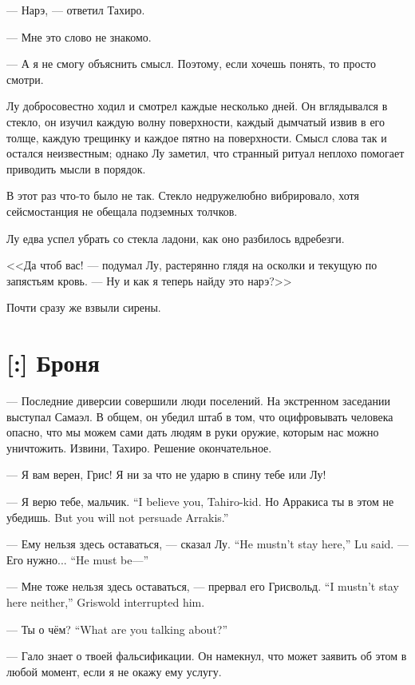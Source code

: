--- Нарэ, --- ответил Тахиро.

--- Мне это слово не знакомо.

--- А я не смогу объяснить смысл.
Поэтому, если хочешь понять, то просто смотри.

Лу добросовестно ходил и смотрел каждые несколько дней.
Он вглядывался в стекло, он изучил каждую волну поверхности, каждый дымчатый извив в его толще, каждую трещинку и каждое пятно на поверхности.
Смысл слова так и остался неизвестным;
однако Лу заметил, что странный ритуал неплохо помогает приводить мысли в порядок.

В этот раз что-то было не так.
Стекло недружелюбно вибрировало, хотя сейсмостанция не обещала подземных толчков.

Лу едва успел убрать со стекла ладони, как оно разбилось вдребезги.

<<Да чтоб вас! --- подумал Лу, растерянно глядя на осколки и текущую по запястьям кровь. --- Ну и как я теперь найду это нарэ?>>

Почти сразу же взвыли сирены.

\section{[:] Броня}

\textspace

--- Последние диверсии совершили люди поселений.
На экстренном заседании выступал Самаэл.
В общем, он убедил штаб в том, что оцифровывать человека опасно, что мы можем сами дать людям в руки оружие, которым нас можно уничтожить.
Извини, Тахиро.
Решение окончательное.

--- Я вам верен, Грис!
Я ни за что не ударю в спину тебе или Лу!

{--- Я верю тебе, мальчик.}
{``I believe you, Tahiro-kid.}
{Но Арракиса ты в этом не убедишь.}
{But you will not persuade Arrakis.''}

{--- Ему нельзя здесь оставаться, --- сказал Лу.}
{``He mustn't stay here,'' Lu said.}
{--- Его нужно...}
{``He must be---''}

{--- Мне тоже нельзя здесь оставаться, --- прервал его Грисвольд.}
{``I mustn't stay here neither,'' Griswold interrupted him.}

{--- Ты о чём?}
{``What are you talking about?''}

--- Гало знает о твоей фальсификации.
Он намекнул, что может заявить об этом в любой момент, если я не окажу ему услугу.


